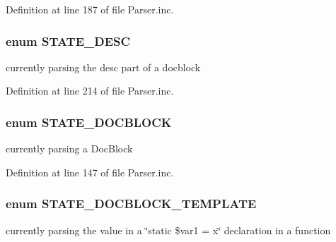 \-Definition at line 187 of file \-Parser.\-inc.

\hypertarget{_parser_8inc_a5593253cbaf8b170bd8c527b0f29ab89}{
\subsubsection[{\-S\-T\-A\-T\-E\-\_\-\-D\-E\-S\-C}]{\setlength{\rightskip}{0pt plus 5cm}enum {\bf \-S\-T\-A\-T\-E\-\_\-\-D\-E\-S\-C}}}\label{_parser_8inc_a5593253cbaf8b170bd8c527b0f29ab89}
currently parsing the desc part of a docblock 

\-Definition at line 214 of file \-Parser.\-inc.

\hypertarget{_parser_8inc_afdfa511d6fc249ba86aa216881e00ee2}{
\subsubsection[{\-S\-T\-A\-T\-E\-\_\-\-D\-O\-C\-B\-L\-O\-C\-K}]{\setlength{\rightskip}{0pt plus 5cm}enum {\bf \-S\-T\-A\-T\-E\-\_\-\-D\-O\-C\-B\-L\-O\-C\-K}}}\label{_parser_8inc_afdfa511d6fc249ba86aa216881e00ee2}
currently parsing a \-Doc\-Block 

\-Definition at line 147 of file \-Parser.\-inc.

\hypertarget{_parser_8inc_afb3c6e387343a9f3e1360a1c3230e01b}{
\subsubsection[{\-S\-T\-A\-T\-E\-\_\-\-D\-O\-C\-B\-L\-O\-C\-K\-\_\-\-T\-E\-M\-P\-L\-A\-T\-E}]{\setlength{\rightskip}{0pt plus 5cm}enum {\bf \-S\-T\-A\-T\-E\-\_\-\-D\-O\-C\-B\-L\-O\-C\-K\-\_\-\-T\-E\-M\-P\-L\-A\-T\-E}}}\label{_parser_8inc_afb3c6e387343a9f3e1360a1c3230e01b}
currently parsing the value in a \char`\"{}static \$var1 = x\char`\"{} declaration in a function 

